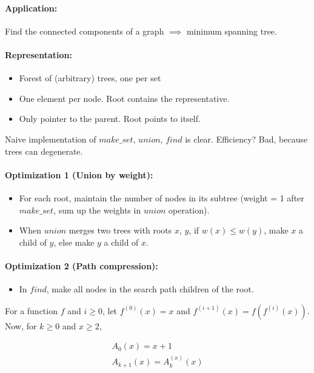 \paragraph{Application:} Find the connected components of a graph $\implies$ minimum spanning tree.

\paragraph{Representation: }
\begin{itemize}
\item Forest of (arbitrary) trees, one per set
\item One element per node. Root contains the representative.
\item Only pointer to the parent. Root points to itself.
\end{itemize}

Naive implementation of ${make\_set}$, ${union}$, ${find}$ is clear. Efficiency? Bad, because trees can degenerate.

\paragraph{Optimization 1 (Union by weight): }
\begin{itemize}
\item For each root, maintain the number of nodes in its subtree (weight = 1 after ${make\_set}$, sum up the weights in ${union}$ operation).
\item When ${union}$ merges two trees with roots $x$, $y$, if $w(x) \le w(y)$, make $x$ a child of $y$, else make $y$ a child of $x$.
\end{itemize}

\paragraph{Optimization 2 (Path compression): } 
\begin{itemize}
\item In ${find}$, make all nodes in the search path children of the root.
\end{itemize}

\begin{mydefinition}
For a function $f$ and $i \ge 0$, let $f^{(0)}(x) = x$ and $f^{(i+1)}(x) = f(f^{(i)}(x))$. Now, for $k\ge 0$ and $x \ge 2$,

\begin{align*}
A_0(x) = x+1 \\
A_{k+1}(x) = A_k^{(x)}(x)
\end{align*}

\end{mydefinition}

